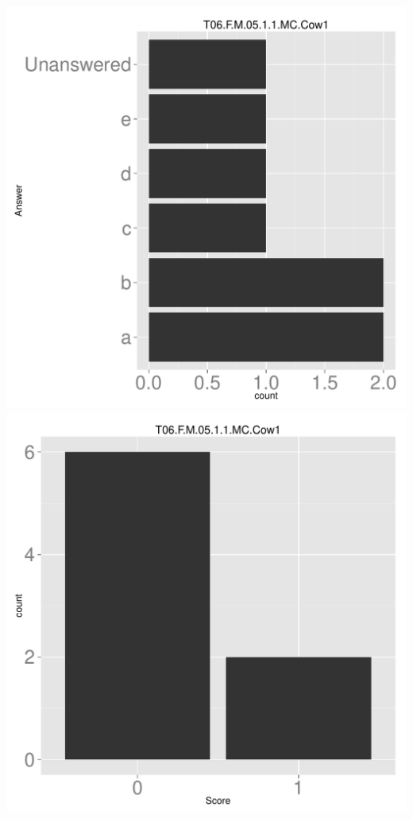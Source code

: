 \documentclass[12pt,english,nohyper]{tufte-handout}\usepackage[]{graphicx}\usepackage[]{color}
\begin{document}
\begin{center} \includegraphics[width=.45\linewidth]{Topic06_AB_49_answer} \includegraphics[width=.45\linewidth]{Topic06_AB_49_score} \end{center} 
\end{document}
